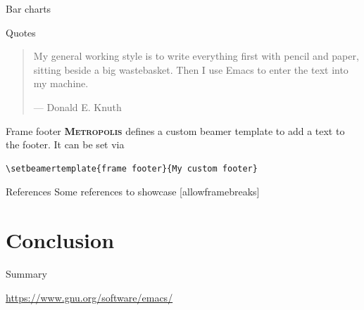 \documentclass[aspectratio=169,usenames,dvipsnames,pdftex]{beamer}
\newcommand{\themename}{\textbf{\textsc{Metropolis}}\xspace}
\begin{document}
	\begin{frame}{Bar charts}
		\begin{figure}
		\end{figure}
	\end{frame}

	\begin{frame}{Quotes}
		\begin{quote}
      My general working style is to write everything first with pencil and paper, sitting beside a big wastebasket. Then I use Emacs to enter the text into my machine.
      \begin{center}— Donald E. Knuth\end{center}
		\end{quote}
	\end{frame}

	{
		\begin{frame}[fragile]{Frame footer}
			\themename defines a custom beamer template to add a text to the footer. It can be set via
			\begin{verbatim}\setbeamertemplate{frame footer}{My custom footer}\end{verbatim}
		\end{frame}
	}

	\begin{frame}{References}
		Some references to showcase [allowframebreaks] \cite{arthur03, dilbert97, napster98, freud12, upsilon87, mentorAcc, mentorUnp}
	\end{frame}

	\section{Conclusion}

	\begin{frame}{Summary}
		\begin{center}\url{https://www.gnu.org/software/emacs/}\end{center}
	\end{frame}
\end{document}
